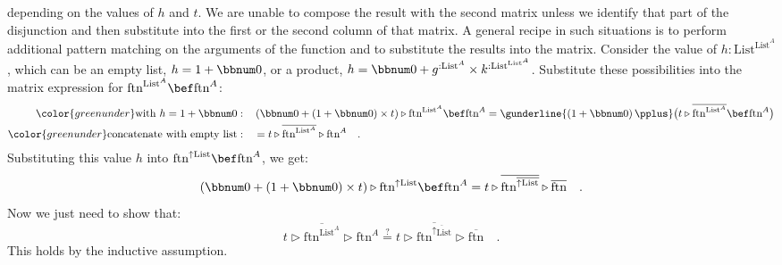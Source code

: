 depending on the values of $h$ and $t$. We are unable to compose
the result with the second matrix unless we identify that part of
the disjunction and then substitute into the first or the second column
of that matrix. A general recipe in such situations is to perform
additional pattern matching on the arguments of the function and to
substitute the results into the matrix. Consider the value of $h:\text{List}^{\text{List}^{A}}$,
which can be an empty list, $h=1+\bbnum 0$, or a product, $h=\bbnum 0+g^{:\text{List}^{A}}\times k^{:\text{List}^{\text{List}^{A}}}$.
Substitute these possibilities into the matrix expression for $\text{ftn}^{\text{List}^{A}}\bef\text{ftn}^{A}$:
\begin{align*}
{\color{greenunder}\text{with }h=1+\bbnum 0:}\quad & \left(\bbnum 0+\left(1+\bbnum 0\right)\times t\right)\triangleright\text{ftn}^{\text{List}^{A}}\bef\text{ftn}^{A}=\gunderline{\left(1+\bbnum 0\right)\pplus}\big(t\triangleright\overline{\text{ftn}^{\text{List}^{A}}}\bef\text{ftn}^{A}\big)\\
{\color{greenunder}\text{concatenate with empty list}:}\quad & =t\triangleright\overline{\text{ftn}^{\text{List}^{A}}}\triangleright\text{ftn}^{A}\quad.
\end{align*}
Substituting this value $h$ into $\text{ftn}^{\uparrow\text{List}}\bef\text{ftn}^{A}$,
we get:
\[
\left(\bbnum 0+\left(1+\bbnum 0\right)\times t\right)\triangleright\text{ftn}^{\uparrow\text{List}}\bef\text{ftn}^{A}=t\triangleright\overline{\text{ftn}^{\overline{\uparrow\text{List}}}}\triangleright\overline{\text{ftn}}\quad.
\]
Now we just need to show that:
\[
t\triangleright\overline{\text{ftn}^{\text{List}^{A}}}\triangleright\text{ftn}^{A}\overset{?}{=}t\triangleright\overline{\text{ftn}^{\overline{\uparrow\text{List}}}}\triangleright\overline{\text{ftn}}\quad.
\]
This holds by the inductive assumption.

